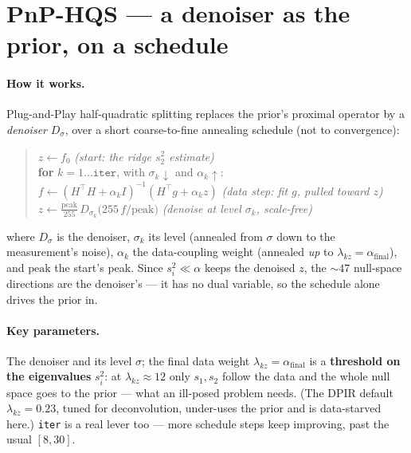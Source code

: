 \section{PnP-HQS --- a denoiser as the prior, on a schedule}
\label{sec:pnp}

\paragraph{How it works.}
Plug-and-Play half-quadratic splitting replaces the prior's proximal operator by a \emph{denoiser}
$D_\sigma$, over a short coarse-to-fine annealing schedule (not to convergence):
\begin{quote}
$z \leftarrow f_0$ \hfill\textit{(start: the ridge $s_2^2$ estimate)}\\
\textbf{for} $k = 1 \dots \texttt{iter}$, with $\sigma_k\!\downarrow$ and $\alpha_k\!\uparrow$:\\
\hspace{1.2em}$f \leftarrow (H^{\!\top}\!H+\alpha_k I)^{-1}(H^{\!\top} g + \alpha_k z)$ \hfill\textit{(data step: fit $g$, pulled toward $z$)}\\
\hspace{1.2em}$z \leftarrow \tfrac{\text{peak}}{255}\,D_{\sigma_k}\!\big(255\,f/\text{peak}\big)$ \hfill\textit{(denoise at level $\sigma_k$, scale-free)}
\end{quote}
\noindent where $D_\sigma$ is the denoiser, $\sigma_k$ its level (annealed from $\sigma$ down to the
measurement's noise), $\alpha_k$ the data-coupling weight (annealed \emph{up} to
$\lambda_{kz}=\alpha_{\text{final}}$), and $\text{peak}$ the start's peak. Since $s_i^2\ll\alpha$
keeps the denoised $z$, the ${\sim}47$ null-space directions are the denoiser's --- it has no dual
variable, so the schedule alone drives the prior in.

\paragraph{Key parameters.}
The denoiser and its level $\sigma$; the final data weight $\lambda_{kz}=\alpha_{\text{final}}$ is a
\textbf{threshold on the eigenvalues} $s_i^2$: at $\lambda_{kz}\approx12$ only $s_1,s_2$ follow the
data and the whole null space goes to the prior --- what an ill-posed problem needs. (The DPIR
default $\lambda_{kz}=0.23$, tuned for deconvolution, under-uses the prior and is data-starved
here.) \texttt{iter} is a real lever too --- more schedule steps keep improving, past the usual
$[8,30]$.

